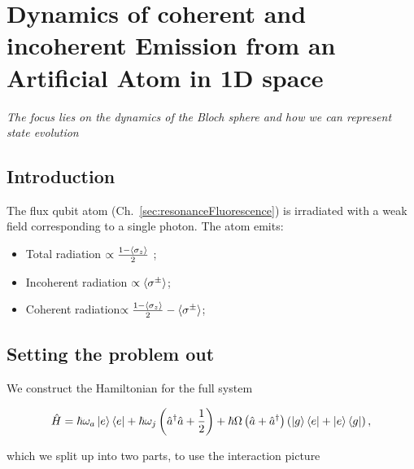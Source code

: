 
\section{Dynamics of coherent and incoherent Emission from an Artificial Atom in 1D space}
\begin{center}
  \textit{The focus lies  on the dynamics of the  Bloch sphere and how we  can represent state
    evolution}      
\end{center}

 \subsection{Introduction}
 The flux  qubit atom  (Ch.~\ref{sec:resonanceFluorescence}) is irradiated  with a  weak field
 corresponding to a single photon. The atom emits:
  
 \begin{itemize}
 \item Total radiation \hfill $ \propto \frac{1-{\left\langle \sigma_z \right\rangle} }{2} $ ;
 \item Incoherent radiation \hfill $ \propto \left\langle \sigma^{\pm} \right\rangle $;
 \item Coherent radiation\hfill $ \propto \frac{1-{\left\langle \sigma_z \right\rangle} }{2} - \left\langle \sigma^{\pm} \right\rangle$;
 \end{itemize}

  
 \subsection{Setting the problem out}
 We construct the Hamiltonian for the full system

  \begin{equation}
    \hat{H} = \hbar\omega_a\ket{e}\bra{e} + \hbar\omega_j\left(\hat{a}^\dagger\hat{a}+\frac{1}{2}\right) + {\hbar \Omega}\left(\hat{a}+\hat{a}^\dagger\right)\left(\ket{g}\bra{e}+\ket{e}\bra{g}\right),
  \end{equation}
  
  \noindent which we split up into two parts, to use the interaction picture

